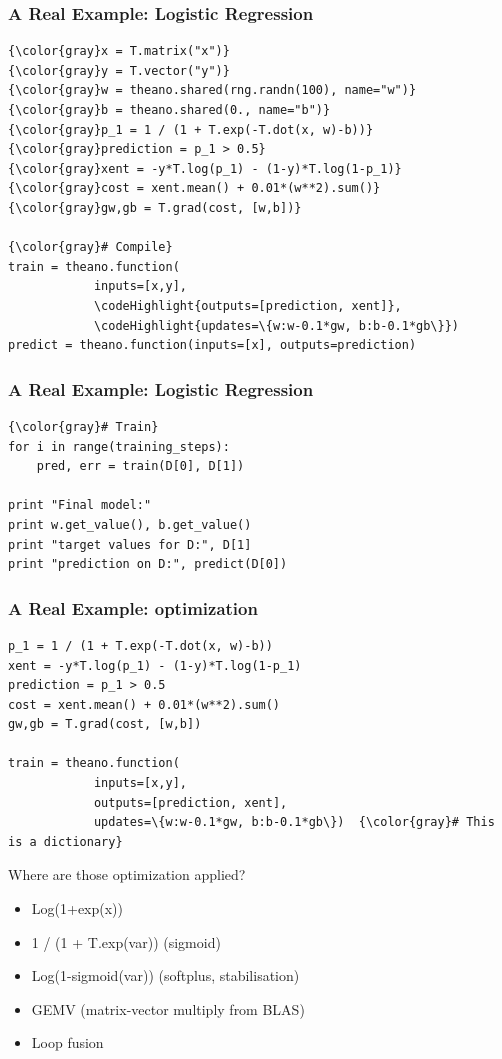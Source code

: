 \documentclass[a4paper,9pt]{beamer}
\begin{document}
\begin{frame}[fragile]
  \frametitle{A Real Example: Logistic Regression}
\begin{Verbatim}[commandchars=\\\{\}]
{\color{gray}x = T.matrix("x")}
{\color{gray}y = T.vector("y")}
{\color{gray}w = theano.shared(rng.randn(100), name="w")}
{\color{gray}b = theano.shared(0., name="b")}
{\color{gray}p_1 = 1 / (1 + T.exp(-T.dot(x, w)-b))}
{\color{gray}prediction = p_1 > 0.5}
{\color{gray}xent = -y*T.log(p_1) - (1-y)*T.log(1-p_1)}
{\color{gray}cost = xent.mean() + 0.01*(w**2).sum()}
{\color{gray}gw,gb = T.grad(cost, [w,b])}

{\color{gray}# Compile}
train = theano.function(
            inputs=[x,y],
            \codeHighlight{outputs=[prediction, xent]},
            \codeHighlight{updates=\{w:w-0.1*gw, b:b-0.1*gb\}})
predict = theano.function(inputs=[x], outputs=prediction)
\end{Verbatim}
\end{frame}

\begin{frame}[fragile]
  \frametitle{A Real Example: Logistic Regression}
\begin{Verbatim}[commandchars=\\\{\}]
{\color{gray}# Train}
for i in range(training_steps):
    pred, err = train(D[0], D[1])

print "Final model:"
print w.get_value(), b.get_value()
print "target values for D:", D[1]
print "prediction on D:", predict(D[0])
\end{Verbatim}
\end{frame}

\begin{frame}[fragile]
  \frametitle{A Real Example: optimization}
\begin{Verbatim}[commandchars=\\\{\}]
p_1 = 1 / (1 + T.exp(-T.dot(x, w)-b))
xent = -y*T.log(p_1) - (1-y)*T.log(1-p_1)
prediction = p_1 > 0.5
cost = xent.mean() + 0.01*(w**2).sum()
gw,gb = T.grad(cost, [w,b])

train = theano.function(
            inputs=[x,y],
            outputs=[prediction, xent],
            updates=\{w:w-0.1*gw, b:b-0.1*gb\})  {\color{gray}# This is a dictionary}
\end{Verbatim}
Where are those optimization applied?
\begin{itemize}
\item Log(1+exp(x))
\item 1 / (1 + T.exp(var)) (sigmoid)
\item Log(1-sigmoid(var)) (softplus, stabilisation)
\item GEMV (matrix-vector multiply from BLAS)
\item Loop fusion
\end{itemize}
\end{frame}
\end{document}
